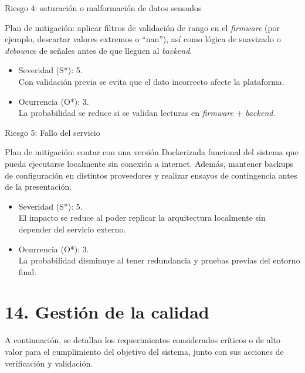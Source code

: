 \documentclass[
11pt, %
]{charter}
\begin{document}
Riesgo 4: saturación o malformación de datos sensados

Plan de mitigación: aplicar filtros de validación de rango en el \textit{firmware} (por ejemplo, descartar valores extremos o “nan”), así como lógica de suavizado o \textit{debounce} de señales antes de que lleguen al \textit{backend}.

\begin{itemize}
	\item Severidad (S*): 5.\\
	Con validación previa se evita que el dato incorrecto afecte la plataforma.
	\item Ocurrencia (O*): 3.\\
	La probabilidad se reduce si se validan lecturas en \textit{firmware} + \textit{backend}.
\end{itemize}
Riesgo 5: Fallo del servicio

Plan de mitigación: contar con una versión Dockerizada funcional del sistema que pueda ejecutarse localmente sin conexión a internet. Además, mantener backups de configuración en distintos proveedores y realizar ensayos de contingencia antes de la presentación.

\begin{itemize}
	\item Severidad (S*): 5.\\
	El impacto se reduce al poder replicar la arquitectura localmente sin depender del servicio externo.
	\item Ocurrencia (O*): 3.\\
	La probabilidad disminuye al tener redundancia y pruebas previas del entorno final.
\end{itemize}

\section{14. Gestión de la calidad}
\label{sec:calidad}

A continuación, se detallan los requerimientos considerados críticos o de alto valor para el cumplimiento del objetivo del sistema, junto con sus acciones de verificación y validación.
\end{document}
